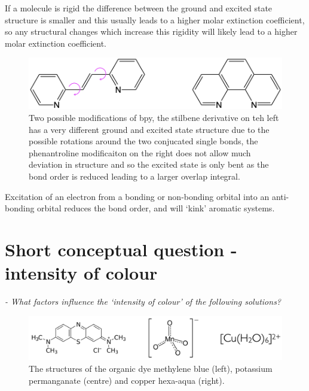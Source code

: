 \documentclass[
]{book}
\begin{document}
If a molecule is rigid the difference between the ground and excited state structure is smaller and this usually leads to a higher molar extinction coefficient, so any structural changes which increase this rigidity will likely lead to a higher molar extinction coefficient.

\begin{figure}

{\centering \includegraphics[width=1\linewidth]{images/structurealts} 

}

\caption{Two possible modifications of bpy, the stilbene derivative on teh left has a very different ground and excited state structure due to the possible rotations around the two conjucated single bonds, the phenantroline modificaiton on the right does not allow much deviation in structure and so the excited state is only bent as the bond order is reduced leading to a larger overlap integral.}\label{fig:bpyalts}
\end{figure}

Excitation of an electron from a bonding or non-bonding orbital into an anti-bonding orbital reduces the bond order, and will `kink' aromatic systems.

\hypertarget{sec:intensity}{%
\section{Short conceptual question - intensity of colour}\label{sec:intensity}}

\emph{- What factors influence the `intensity of colour' of the following solutions?}

\begin{figure}

{\centering \includegraphics[width=0.7\linewidth]{images/molarextquestion} 

}

\caption{The structures of the organic dye methylene blue (left), potassium permanganate (centre) and copper hexa-aqua (right).}\label{fig:molarextstructures}
\end{figure}
\end{document}
